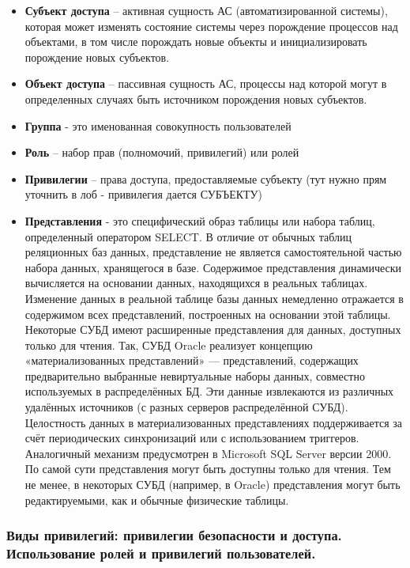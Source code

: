\begin{itemize}
    \item \textbf{Субъект доступа} – активная сущность АС (автоматизированной системы), которая может
        изменять состояние системы через порождение процессов над объектами, в том числе порождать
        новые объекты и инициализировать порождение новых субъектов.
    \item \textbf{Объект доступа} – пассивная сущность АС, процессы над которой могут в определенных случаях
        быть источником порождения новых субъектов.
    \item \textbf{Группа} - это именованная совокупность пользователей
    \item \textbf{Роль} – набор прав (полномочий, привилегий) или ролей
    \item \textbf{Привилегии} – права доступа, предоставляемые субъекту (тут нужно прям уточнить в лоб -
        привилегия дается СУБЪЕКТУ)
    \item \textbf{Представления} - это специфический образ таблицы или набора таблиц, определенный
        оператором SELECT. В отличие от обычных таблиц реляционных баз данных, представление не
        является самостоятельной частью набора данных, хранящегося в базе. Содержимое представления
        динамически вычисляется на основании данных, находящихся в реальных таблицах. Изменение
        данных в реальной таблице базы данных немедленно отражается в содержимом всех
        представлений, построенных на основании этой таблицы. Некоторые СУБД имеют расширенные
        представления для данных, доступных только для чтения.
        Так, СУБД Oracle реализует концепцию
        «материализованных представлений» — представлений, содержащих предварительно выбранные
        невиртуальные наборы данных, совместно используемых в распределённых БД. Эти данные
        извлекаются из различных удалённых источников (с разных серверов распределённой СУБД).
        Целостность данных в материализованных представлениях поддерживается за счёт периодических
        синхронизаций или с использованием триггеров. Аналогичный механизм предусмотрен в Microsoft
        SQL Server версии 2000. По самой сути представления могут быть доступны только для чтения.
        Тем не менее, в некоторых СУБД (например, в Oracle) представления могут быть редактируемыми,
        как и обычные физические таблицы.
\end{itemize}


\subsubsection{Виды привилегий: привилегии безопасности и доступа. Использование ролей и привилегий пользователей.}

